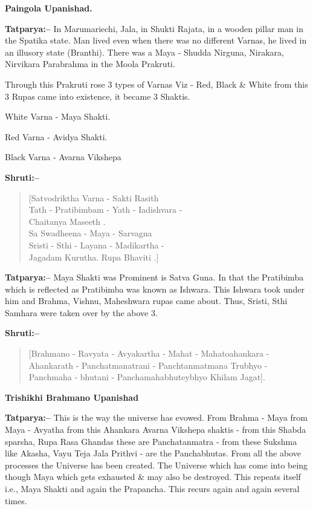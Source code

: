 \begin{flushright}
\textbf{Paingola Upanishad.}
\end{flushright}

\textbf{Tatparya:–} In Marumariechi, Jala, in Shukti Rajata, in a wooden pillar man in the Spatika state. Man lived even when there was no different Varnas, he lived in an illusory state (Branthi). There was a Maya - Shudda Nirguna, Nirakara, Nirvikara Parabrahma in the Moola Prakruti.

Through this Prakruti rose 3 types of Varnas Viz - Red, Black \& White from this 3 Rupas came into existence, it became 3 Shaktis.

White Varna - Maya Shakti.

Red Varna - Avidya Shakti.

Black Varna - Avarna Vikshepa

\textbf{Shruti:–}

\begin{verse}
[Satvodriktha Varna - Sakti Rasith \\ Tath - Pratibimbam - Yath - Iadishvara -\\ Chaitanya Maseeth .\\ Sa Swadheena - Maya - Sarvagna \\ Sristi - Sthi - Layana - Madikartha -\\ Jagadam Kurutha. Rupa Bhaviti .]
\end{verse}

\textbf{Tatparya:–} Maya Shakti was Prominent is Satva Guna. In that the Pratibimba which is reflected as Pratibimba was known as Ishwara. This Ishwara took under him and Brahma, Vishnu, Maheshwara rupas came about. Thus, Sristi, Sthi Samhara were taken over by the above 3.

\textbf{Shruti:–}

\begin{verse}
[Brahmano - Ravyata - Avyakartha - Mahat - Mahato\break ahankara - Ahankarath - Panchatmanatrani - Panchtanmatmana Trubhyo - Panchmaha - bhutani - Panchamahabhuteybhyo Khilam Jagat].
\end{verse}

\begin{flushright}
\textbf{Trishikhi Brahmano Upanishad}
\end{flushright}

\textbf{Tatparya:–} This is the way the universe has evowed. From Brahma - Maya from Maya - Avyatha from this Ahankara Avarna Vikshepa shaktis - from this Shabda sparsha, Rupa Rasa Ghandas these are Panchatanmatra - from these Sukshma like Akasha, Vayu Teja Jala Prithvi - are the Panchabhutas. From all the above processes the Universe has been created. The Universe which has come into being though Maya which gets exhausted \& may also be destroyed. This repeats itself i.e., Maya Shakti and again the Prapancha. This recurs again and again several times.

